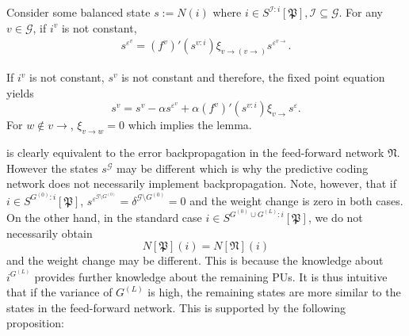 \documentclass[a4paper,11pt]{report}
\begin{document}
\begin{Lem}\label{lem:predi-error-formula}
Consider some balanced state $s:=N(i)$ where $i\in S^{\mathcal{I}:i}[\mathfrak{P}],\mathcal{I}\subseteq\mathcal{G}$. For any $v\in\mathcal{G}$, if $i^v$ is not constant, 
\begin{align*}
s^{\varepsilon^v}=\left(f^v\right)'(s^{v:i})\xi_{v\to(v\to)}s^{\varepsilon^{v\to}}.
\end{align*}
\end{Lem}

\begin{Bew}
If $i^v$ is not constant, $s^v$ is not constant and therefore, the fixed point equation yields
\[
s^v=s^v-\alpha s^{\varepsilon^v}+\alpha\left(f^v\right)'(s^{v:i})\xi_{v\to}s^{\varepsilon}.
\]
For $w\notin v\to$, $\xi_{v\to w}=0$ which implies the lemma.
\end{Bew}

\begin{Par}
 is clearly equivalent to the error backpropagation in the feed-forward network $\mathfrak{N}$. However the states $s^{\mathcal{G}}$ may be different which is why the predictive coding network does not necessarily implement backpropagation. Note, however, that if $i\in S^{G^{(0)}:i}[\mathfrak{P}]$, $s^{\varepsilon^{\mathcal{G}\setminus G^{(0)}}}=\delta^{\mathcal{G}\setminus G^{(0)}}=0$ and the weight change is zero in both cases. On the other hand, in the standard case $i\in S^{G^{(0)}\cup G^{(L)}:i}[\mathfrak{P}]$, we do not necessarily obtain
\[
N[\mathfrak{P}](i)=N[\mathfrak{N}](i)
\]
and the weight change may be different. This is because the knowledge about $i^{G^{(L)}}$ provides further knowledge about the remaining PUs. It is thus intuitive that if the variance of $G^{(L)}$ is high, the remaining states are more similar to the states in the feed-forward network. This is supported by the following proposition:
\end{Par}
\end{document}
